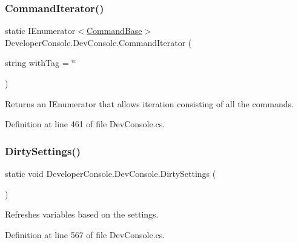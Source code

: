 \subsubsection{\texorpdfstring{Command\+Iterator()}{CommandIterator()}}
{\footnotesize\ttfamily static I\+Enumerator$<$\hyperlink{class_developer_console_1_1_core_1_1_command_base}{Command\+Base}$>$ Developer\+Console.\+Dev\+Console.\+Command\+Iterator (\begin{DoxyParamCaption}\item[{string}]{with\+Tag = {\ttfamily \char`\"{}\char`\"{}} }\end{DoxyParamCaption})\hspace{0.3cm}{\ttfamily [static]}}



Returns an I\+Enumerator that allows iteration consisting of all the commands. 



Definition at line 461 of file Dev\+Console.\+cs.

\mbox{\label{class_developer_console_1_1_dev_console_aa4212f80280155e1b14e57b16d81863f}} 
\subsubsection{\texorpdfstring{Dirty\+Settings()}{DirtySettings()}}
{\footnotesize\ttfamily static void Developer\+Console.\+Dev\+Console.\+Dirty\+Settings (\begin{DoxyParamCaption}{ }\end{DoxyParamCaption})\hspace{0.3cm}{\ttfamily [static]}}



Refreshes variables based on the settings. 



Definition at line 567 of file Dev\+Console.\+cs.

\mbox{\label{class_developer_console_1_1_dev_console_af57ec8873f1664aefe8574da21a18e3f}} 
